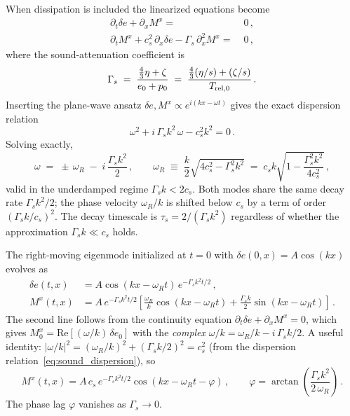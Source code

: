 \documentclass[12pt,aps,preprint,nofootinbib,noshowkeys,noshowpacs,longbibliography,superscriptaddress,tightenlines]{revtex4-2}
\begin{document}
When dissipation is included the linearized equations become
\begin{align}
  \partial_t \delta e +  \partial_x M^x =& \;0 \,, \\
  \partial_t M^x +  c_s^2\, \partial_x \delta e - \Gamma_s\, \partial_x^2 M^x =& \;0 \,,
\end{align}
where the sound-attenuation coefficient is
\begin{equation}
  \Gamma_s \;=\; \frac{\tfrac{4}{3}\eta + \zeta}{e_0 + p_0}
            \;=\; \frac{\tfrac{4}{3}(\eta/s) + (\zeta/s)}{T_{{\rm rel},0}} \,.
\end{equation}
Inserting the plane-wave ansatz $\delta e, M^x \propto e^{i(kx-\omega t)}$
gives the exact dispersion relation
\begin{equation}
  \omega^2 + i\,\Gamma_s k^2\,\omega - c_s^2 k^2 = 0 \,.
\end{equation}
Solving exactly,
\begin{equation}
\label{eq:sound_dispersion}
  \omega \;=\; \pm\,\omega_R \;-\; i\,\frac{\Gamma_s k^2}{2} \,, \qquad
  \omega_R \;\equiv\; \frac{k}{2}\sqrt{4c_s^2 - \Gamma_s^2 k^2}
           \;=\; c_s k\sqrt{1 - \frac{\Gamma_s^2 k^2}{4c_s^2}} \,,
\end{equation}
valid in the underdamped regime $\Gamma_s k < 2c_s$.
Both modes share the same decay rate $\Gamma_s k^2/2$; the phase velocity
$\omega_R/k$ is shifted below $c_s$ by a term of order ${(\Gamma_s k/c_s)}^2$.
The decay timescale is $\tau_s = 2/(\Gamma_s k^2)$ regardless of whether the
approximation $\Gamma_s k \ll c_s$ holds.

The right-moving eigenmode initialized at $t=0$ with $\delta e(0,x)=A\cos(kx)$
evolves as
\begin{align}
\label{eq:sound_sol}
  \delta e(t,x) &= A\cos(kx - \omega_R t)\,e^{-\Gamma_s k^2 t/2} \,, \\
  M^x(t,x)      &= A\,e^{-\Gamma_s k^2 t/2}
    \left[\frac{\omega_R}{k}\cos(kx-\omega_R t)
         +\frac{\Gamma_s k}{2}\sin(kx-\omega_R t)\right] \,.
\end{align}
The second line follows from the continuity equation
$\partial_t\delta e + \partial_x M^x = 0$, which gives
$M^x_0 = \mathrm{Re}[(\omega/k)\,\delta e_0]$ with the \emph{complex}
$\omega/k = \omega_R/k - i\,\Gamma_s k/2$.
A useful identity: $|\omega/k|^2 = (\omega_R/k)^2 + (\Gamma_s k/2)^2 = c_s^2$
(from the dispersion relation~\eqref{eq:sound_dispersion}), so
\begin{equation}
  M^x(t,x) = A\,c_s\,e^{-\Gamma_s k^2 t/2}\cos(kx-\omega_R t - \varphi)\,,
  \qquad
  \varphi = \arctan\!\left(\frac{\Gamma_s k^2}{2\,\omega_R}\right) \,.
\end{equation}
The phase lag $\varphi$ vanishes as $\Gamma_s\to 0$.
\end{document}

